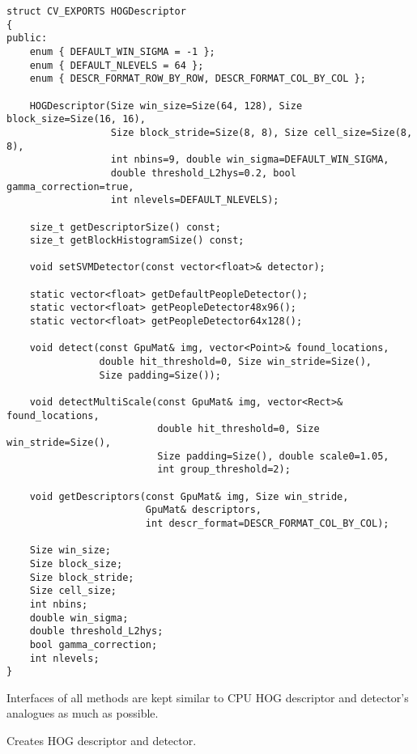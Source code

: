 \begin{lstlisting}
struct CV_EXPORTS HOGDescriptor
{
public:
    enum { DEFAULT_WIN_SIGMA = -1 };
    enum { DEFAULT_NLEVELS = 64 };
    enum { DESCR_FORMAT_ROW_BY_ROW, DESCR_FORMAT_COL_BY_COL };

    HOGDescriptor(Size win_size=Size(64, 128), Size block_size=Size(16, 16),
                  Size block_stride=Size(8, 8), Size cell_size=Size(8, 8),
                  int nbins=9, double win_sigma=DEFAULT_WIN_SIGMA,
                  double threshold_L2hys=0.2, bool gamma_correction=true,
                  int nlevels=DEFAULT_NLEVELS);

    size_t getDescriptorSize() const;
    size_t getBlockHistogramSize() const;

    void setSVMDetector(const vector<float>& detector);

    static vector<float> getDefaultPeopleDetector();
    static vector<float> getPeopleDetector48x96();
    static vector<float> getPeopleDetector64x128();

    void detect(const GpuMat& img, vector<Point>& found_locations, 
                double hit_threshold=0, Size win_stride=Size(), 
                Size padding=Size());

    void detectMultiScale(const GpuMat& img, vector<Rect>& found_locations,
                          double hit_threshold=0, Size win_stride=Size(), 
                          Size padding=Size(), double scale0=1.05, 
                          int group_threshold=2);

    void getDescriptors(const GpuMat& img, Size win_stride, 
                        GpuMat& descriptors,
                        int descr_format=DESCR_FORMAT_COL_BY_COL);

    Size win_size;
    Size block_size;
    Size block_stride;
    Size cell_size;
    int nbins;
    double win_sigma;
    double threshold_L2hys;
    bool gamma_correction;
    int nlevels;
}
\end{lstlisting}

Interfaces of all methods are kept similar to CPU HOG descriptor and detector's analogues as much as possible.

Creates HOG descriptor and detector.


